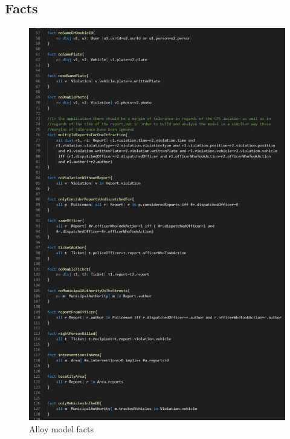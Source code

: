 \subsection{Facts}
\begin{figure}[h!]
	\includegraphics[scale=0.55]{Images/Facts_1-1}
	\caption{Alloy model facts}
\end{figure}
\newpage
